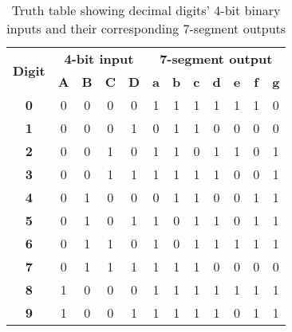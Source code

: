 \documentclass[12pt]{article}
\begin{document}
\newpage

\begin{table}[h]
  \centering
  \begin{tabular}{ | c | c | c | c | c || c | c | c | c | c | c | c | }
  \hline
  \multirow{2}{*}{\textbf{Digit}} & \multicolumn{4}{c||}{\textbf{4-bit input}}        & \multicolumn{7}{c|}{\textbf{7-segment output}}                                           \\ \cline{2-12}
                  & \textbf{A} & \textbf{B} & \textbf{C} & \textbf{D} & \textbf{a} & \textbf{b} & \textbf{c} & \textbf{d} & \textbf{e} & \textbf{f} & \textbf{g} \\ \hline
  \textbf{0}                      & 0          & 0          & 0          & 0          & 1          & 1          & 1          & 1          & 1          & 1          & 0          \\ \hline
  \textbf{1}                      & 0          & 0          & 0          & 1          & 0          & 1          & 1          & 0          & 0          & 0          & 0          \\ \hline
  \textbf{2}                      & 0          & 0          & 1          & 0          & 1          & 1          & 0          & 1          & 1          & 0          & 1          \\ \hline
  \textbf{3}                      & 0          & 0          & 1          & 1          & 1          & 1          & 1          & 1          & 0          & 0          & 1          \\ \hline
  \textbf{4}                      & 0          & 1          & 0          & 0          & 0          & 1          & 1          & 0          & 0          & 1          & 1          \\ \hline
  \textbf{5}                      & 0          & 1          & 0          & 1          & 1          & 0          & 1          & 1          & 0          & 1          & 1          \\ \hline
  \textbf{6}                      & 0          & 1          & 1          & 0          & 1          & 0          & 1          & 1          & 1          & 1          & 1          \\ \hline
  \textbf{7}                      & 0          & 1          & 1          & 1          & 1          & 1          & 1          & 0          & 0          & 0          & 0          \\ \hline
  \textbf{8}                      & 1          & 0          & 0          & 0          & 1          & 1          & 1          & 1          & 1          & 1          & 1          \\ \hline
  \textbf{9}                      & 1          & 0          & 0          & 1          & 1          & 1          & 1          & 1          & 0          & 1          & 1          \\ \hline
  \end{tabular}
  \caption{Truth table showing decimal digits' 4-bit binary inputs and their corresponding 7-segment outputs}
  \label{table:1}
\end{table}
\end{document}
